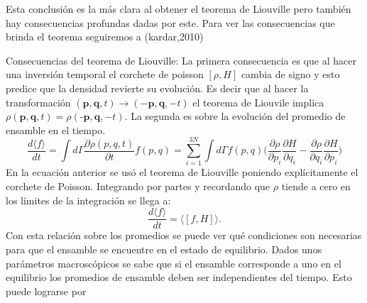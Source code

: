 Esta conclusión es la más clara al obtener el teorema de Liouville pero también hay consecuencias profundas dadas por este. Para ver las consecuencias que brinda el teorema seguiremos a (kardar,2010) 

Consecuencias del teorema de Liouville: La primera consecuencia es que al hacer una inversión temporal el corchete de poisson $[\rho, H]$ cambia de signo y esto predice que la densidad revierte su evolución. Es decir que al hacer la transformación $(\textbf{p},\textbf{q},t) \to (-\textbf{p},\textbf{q},-t)$ el teorema de Liouvile implica $\rho(\textbf{p},\textbf{q},t)=\rho(\textbf{-p},\textbf{q},-t)$.
La segunda es sobre la evolución del promedio de ensamble en el tiempo.
\begin{equation}
\frac{d \langle f \rangle}{dt}= \int d \Gamma \frac{\partial \rho(p,q,t)}{\partial t} f(p,q)= \sum_{i=1}^{3N} \int d\Gamma f(p,q) \Big( \frac{\partial \rho}{\partial p_{i}}\frac{\partial H}{\partial q_{i}} - \frac{\partial \rho}{\partial q_{i}}\frac{\partial H}{\partial p_{i}}  \Big)
\end{equation}
En la ecuación anterior se usó el teorema de Liouville poniendo explícitamente el corchete de Poisson. Integrando por partes y recordando que $\rho$ tiende a cero en los límites de la integración se llega a:
\begin{equation}
\frac{d \langle f \rangle}{dt}= \langle [ f,H] \rangle.
\end{equation}
Con esta relación sobre los promedios se puede ver qué condiciones son necesarias para que el ensamble se encuentre en el estado de equilibrio. Dados unos parámetros macroscópicos se sabe que si el ensamble corresponde a uno en el equilibrio los promedios de ensamble deben ser independientes del tiempo. Esto puede lograrse por
 
